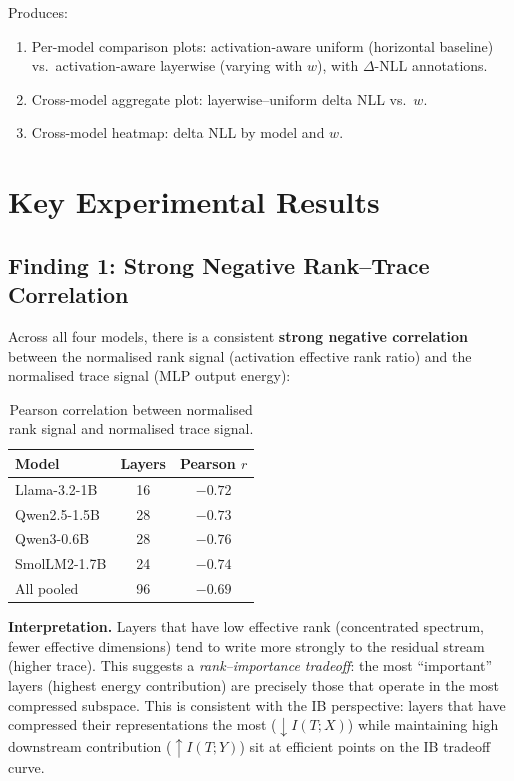 \documentclass[11pt]{article}
\begin{document}
Produces:
\begin{enumerate}
    \item Per-model comparison plots: activation-aware uniform (horizontal baseline) vs.\ activation-aware layerwise (varying with $w$), with $\Delta$-NLL annotations.
    \item Cross-model aggregate plot: layerwise--uniform delta NLL vs.\ $w$.
    \item Cross-model heatmap: delta NLL by model and $w$.
\end{enumerate}

\section{Key Experimental Results}

\subsection{Finding 1: Strong Negative Rank--Trace Correlation}

Across all four models, there is a consistent \textbf{strong negative correlation} between the normalised rank signal (activation effective rank ratio) and the normalised trace signal (MLP output energy):

\begin{table}[H]
\centering
\caption{Pearson correlation between normalised rank signal and normalised trace signal.}
\begin{tabular}{lcc}
\toprule
\textbf{Model} & \textbf{Layers} & \textbf{Pearson $r$} \\
\midrule
Llama-3.2-1B   & 16 & $-0.72$ \\
Qwen2.5-1.5B   & 28 & $-0.73$ \\
Qwen3-0.6B     & 28 & $-0.76$ \\
SmolLM2-1.7B   & 24 & $-0.74$ \\
\midrule
All pooled      & 96 & $-0.69$ \\
\bottomrule
\end{tabular}
\end{table}

\noindent\textbf{Interpretation.}  Layers that have low effective rank (concentrated spectrum, fewer effective dimensions) tend to write more strongly to the residual stream (higher trace).  This suggests a \emph{rank--importance tradeoff}: the most ``important'' layers (highest energy contribution) are precisely those that operate in the most compressed subspace.  This is consistent with the IB perspective: layers that have compressed their representations the most ($\downarrow I(T;X)$) while maintaining high downstream contribution ($\uparrow I(T;Y)$) sit at efficient points on the IB tradeoff curve.
\end{document}
